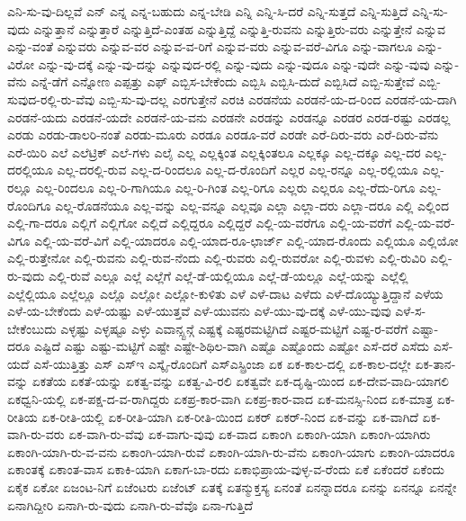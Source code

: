 {ಎನಿ-ಸು-ವು-ದಿಲ್ಲವೆ
ಎನ್
ಎನ್ನ
ಎನ್ನ-ಬಹುದು
ಎನ್ನ-ಬೇಡಿ
ಎನ್ನಿ
ಎನ್ನಿ-ಸಿ-ದರೆ
ಎನ್ನಿ-ಸುತ್ತದೆ
ಎನ್ನಿ-ಸುತ್ತಿದೆ
ಎನ್ನಿ-ಸು-ವುದು
ಎನ್ನುತ್ತಾನೆ
ಎನ್ನುತ್ತಾರೆ
ಎನ್ನುತ್ತಿದೆ-ಎಂತಹ
ಎನ್ನುತ್ತಿದ್ದೆ
ಎನ್ನುತ್ತಿ-ರುವನು
ಎನ್ನುತ್ತಿರು-ವರು
ಎನ್ನುತ್ತೇನೆ
ಎನ್ನುವ
ಎನ್ನು-ವಂತೆ
ಎನ್ನುವರು
ಎನ್ನುವ-ವರ
ಎನ್ನುವ-ವ-ರಿಗೆ
ಎನ್ನುವ-ವರು
ಎನ್ನುವ-ವರೆ-ವಿಗೂ
ಎನ್ನು-ವಾಗಲೂ
ಎನ್ನು-ವಿರೋ
ಎನ್ನು-ವು-ದಕ್ಕೆ
ಎನ್ನು-ವು-ದನ್ನು
ಎನ್ನುವುದ-ರಲ್ಲಿ
ಎನ್ನು-ವುದು
ಎನ್ನು-ವುದೂ
ಎನ್ನು-ವುದೇ
ಎನ್ನು-ವುವು
ಎನ್ನು-ವೆನು
ಎನ್ನೆ-ಡೆಗೆ
ಎನ್ನೋಣ
ಎಪ್ಪತ್ತು
ಎಫ್
ಎಬ್ಬಿಸ-ಬೇಕೆಂದು
ಎಬ್ಬಿಸಿ
ಎಬ್ಬಿಸಿ-ದುದೆ
ಎಬ್ಬಿಸಿದೆ
ಎಬ್ಬಿ-ಸುತ್ತೇವೆ
ಎಬ್ಬಿ-ಸುವುದ-ರಲ್ಲಿ-ರು-ವೆವು
ಎಬ್ಬಿ-ಸು-ವು-ದಲ್ಲ
ಎರಗುತ್ತೇನೆ
ಎರಚಿ
ಎರಡನೆಯ
ಎರಡನೆ-ಯ-ದ-ರಿಂದ
ಎರಡನೆ-ಯ-ದಾಗಿ
ಎರಡನೆ-ಯದು
ಎರಡನೆ-ಯದೇ
ಎರಡನೆ-ಯ-ವನು
ಎರಡನೇ
ಎರಡನ್ನು
ಎರಡನ್ನೂ
ಎರಡರ
ಎರಡ-ರಷ್ಟು
ಎರಡಲ್ಲ
ಎರಡು
ಎರಡು-ಡಾಲರಿ-ನಂತೆ
ಎರಡು-ಮೂರು
ಎರಡೂ
ಎರಡೂ-ವರೆ
ಎರಡೇ
ಎರೆ-ದಿರು-ವರು
ಎರೆ-ದಿರು-ವೆನು
ಎರೆ-ಯಿರಿ
ಎಲೆ
ಎಲೆಟ್ರಿಕ್
ಎಲೆ-ಗಳು
ಎಲೈ
ಎಲ್ಲ
ಎಲ್ಲಕ್ಕಿಂತ
ಎಲ್ಲಕ್ಕಿಂತಲೂ
ಎಲ್ಲಕ್ಕೂ
ಎಲ್ಲ-ದಕ್ಕೂ
ಎಲ್ಲ-ದರ
ಎಲ್ಲ-ದರಲ್ಲಿಯೂ
ಎಲ್ಲ-ದರಲ್ಲಿ-ರುವ
ಎಲ್ಲ-ದ-ರಿಂದಲೂ
ಎಲ್ಲ-ದ-ರೊಂದಿಗೆ
ಎಲ್ಲರ
ಎಲ್ಲ-ರನ್ನೂ
ಎಲ್ಲ-ರಲ್ಲಿಯೂ
ಎಲ್ಲ-ರಲ್ಲೂ
ಎಲ್ಲ-ರಿಂದಲೂ
ಎಲ್ಲ-ರಿ-ಗಾಗಿಯೂ
ಎಲ್ಲ-ರಿ-ಗಿಂತ
ಎಲ್ಲ-ರಿಗೂ
ಎಲ್ಲರು
ಎಲ್ಲರೂ
ಎಲ್ಲ-ರೆದು-ರಿಗೂ
ಎಲ್ಲ-ರೊಂದಿಗೂ
ಎಲ್ಲ-ರೊಡನೆಯೂ
ಎಲ್ಲ-ವನ್ನು
ಎಲ್ಲ-ವನ್ನೂ
ಎಲ್ಲವೂ
ಎಲ್ಲಾ
ಎಲ್ಲಾ-ದರು
ಎಲ್ಲಾ-ದರೂ
ಎಲ್ಲಿ
ಎಲ್ಲಿಂದ
ಎಲ್ಲಿ-ಗಾ-ದರೂ
ಎಲ್ಲಿಗೆ
ಎಲ್ಲಿಗೋ
ಎಲ್ಲಿದೆ
ಎಲ್ಲಿದ್ದರೂ
ಎಲ್ಲಿದ್ದರೆ
ಎಲ್ಲಿ-ಯ-ವರೆಗೂ
ಎಲ್ಲಿ-ಯ-ವರೆಗೆ
ಎಲ್ಲಿ-ಯ-ವರೆ-ವಿಗೂ
ಎಲ್ಲಿ-ಯ-ವರೆ-ವಿಗೆ
ಎಲ್ಲಿ-ಯಾದರೂ
ಎಲ್ಲಿ-ಯಾದ-ರೂ-ಛಾರ್ಜ್
ಎಲ್ಲಿ-ಯಾದ-ರೊಂದು
ಎಲ್ಲಿಯೂ
ಎಲ್ಲಿಯೋ
ಎಲ್ಲಿ-ರುತ್ತೇನೋ
ಎಲ್ಲಿ-ರುವನು
ಎಲ್ಲಿ-ರುವ-ನೆಂದು
ಎಲ್ಲಿ-ರುವರು
ಎಲ್ಲಿ-ರುವರೋ
ಎಲ್ಲಿ-ರುವಳು
ಎಲ್ಲಿ-ರುವಿರಿ
ಎಲ್ಲಿ-ರು-ವುದು
ಎಲ್ಲಿ-ರುವೆ
ಎಲ್ಲೂ
ಎಲ್ಲೆ
ಎಲ್ಲೆಗೆ
ಎಲ್ಲೆ-ಡೆ-ಯಲ್ಲಿಯೂ
ಎಲ್ಲೆ-ಡೆ-ಯಲ್ಲೂ
ಎಲ್ಲೆ-ಯನ್ನು
ಎಲ್ಲೆಲ್ಲಿ
ಎಲ್ಲೆಲ್ಲಿಯೂ
ಎಲ್ಲೆಲ್ಲೂ
ಎಲ್ಲೊ
ಎಲ್ಲೋ
ಎಲ್ಲೋ-ಕುಳಿತು
ಎಳೆ
ಎಳೆ-ದಾಟ
ಎಳೆದು
ಎಳೆ-ದೊಯ್ಯುತ್ತಿದ್ದಾನೆ
ಎಳೆಯ
ಎಳೆ-ಯ-ಬೇಕೆಂದು
ಎಳೆ-ಯಷ್ಟು
ಎಳೆ-ಯುತ್ತವೆ
ಎಳೆ-ಯುವನು
ಎಳೆ-ಯು-ವು-ದಕ್ಕೆ
ಎಳೆ-ಯು-ವುವು
ಎಳೆ-ಸ-ಬೇಕೆಂಬುದು
ಎಳ್ಳಷ್ಟು
ಎಳ್ಳಷ್ಟೂ
ಎಳ್ಳು
ಎವಾನ್ಸ್ಟನ್ಗೆ
ಎಷ್ಟಕ್ಕೆ
ಎಷ್ಟರಮಟ್ಟಿಗಿದೆ
ಎಷ್ಟರ-ಮಟ್ಟಿಗೆ
ಎಷ್ಟ-ರ-ವರೆಗೆ
ಎಷ್ಟಾ-ದರೂ
ಎಷ್ಟಿದೆ
ಎಷ್ಟು
ಎಷ್ಟು-ಮಟ್ಟಿಗೆ
ಎಷ್ಟೇ
ಎಷ್ಟೇ-ಶಿಥಿಲ-ವಾಗಿ
ಎಷ್ಟೊ
ಎಷ್ಟೊಂದು
ಎಷ್ಟೋ
ಎಸೆ-ದರೆ
ಎಸೆದು
ಎಸೆ-ಯದೆ
ಎಸೆ-ಯುತ್ತಿತ್ತು
ಎಸ್
ಎಸ್ಇ
ಎಸ್ಕೈ-ರೊಂದಿಗೆ
ಎಸ್ಎಸ್ಪ್ರಿಂಜಾ
ಏಕ
ಏಕ-ಕಾಲ-ದಲ್ಲಿ
ಏಕ-ಕಾಲ-ದಲ್ಲೇ
ಏಕ-ತಾನ-ವನ್ನು
ಏಕತೆಯ
ಏಕತೆ-ಯನ್ನು
ಏಕತ್ವ-ವನ್ನು
ಏಕತ್ವ-ವಿ-ರಲಿ
ಏಕತ್ವವೇ
ಏಕ-ದೃಷ್ಟಿ-ಯಿಂದ
ಏಕ-ದೇವ-ವಾದಿ-ಯಾಗಲಿ
ಏಕಧ್ವನಿ-ಯಲ್ಲಿ
ಏಕ-ಪಕ್ಷ-ದ-ವ-ರಾಗಿದ್ದರು
ಏಕಪ್ರ-ಕಾರ-ವಾಗಿ
ಏಕಪ್ರ-ಕಾರ-ವಾದ
ಏಕ-ಮನಸ್ಸಿ-ನಿಂದ
ಏಕ-ಮಾತ್ರ
ಏಕ-ರೀತಿಯ
ಏಕ-ರೀತಿ-ಯಲ್ಲಿ
ಏಕ-ರೀತಿ-ಯಾಗಿ
ಏಕ-ರೀತಿ-ಯಿಂದ
ಏಕರ್
ಏಕರ್-ನಿಂದ
ಏಕ-ವನ್ನು
ಏಕ-ವಾಗಿದೆ
ಏಕ-ವಾಗಿ-ರು-ವರು
ಏಕ-ವಾಗಿ-ರು-ವೆವು
ಏಕ-ವಾಗು-ವುವು
ಏಕ-ವಾದ
ಏಕಾಂಗಿ
ಏಕಾಂಗಿ-ಯಾಗಿ
ಏಕಾಂಗಿ-ಯಾಗಿರು
ಏಕಾಂಗಿ-ಯಾಗಿ-ರು-ವ-ವನು
ಏಕಾಂಗಿ-ಯಾಗಿ-ರುವೆ
ಏಕಾಂಗಿ-ಯಾಗಿ-ರು-ವೆನು
ಏಕಾಂಗಿ-ಯಾಗು
ಏಕಾಂಗಿ-ಯಾದರೂ
ಏಕಾಂತಕ್ಕೆ
ಏಕಾಂತ-ವಾಸ
ಏಕಾಕಿ-ಯಾಗಿ
ಏಕಾಗ-ಬಾ-ರದು
ಏಕಾಭಿಪ್ರಾಯ-ವುಳ್ಳ-ವ-ರೆಂದು
ಏಕೆ
ಏಕೆಂದರೆ
ಏಕೆಂದು
ಏಕೈಕ
ಏಕೋ
ಏಜಂಟ-ನಿಗೆ
ಏಜೆಂಟರು
ಏಜೆಂಟ್
ಏತಕ್ಕೆ
ಏತನ್ಮುಕ್ತಸ್ಯ
ಏನಂತೆ
ಏನನ್ನಾದರೂ
ಏನನ್ನು
ಏನನ್ನೂ
ಏನನ್ನೇ
ಏನಾಗಿದ್ದೀರಿ
ಏನಾಗಿ-ರು-ವುದು
ಏನಾಗಿ-ರು-ವೆವೊ
ಏನಾ-ಗುತ್ತಿದೆ
}
